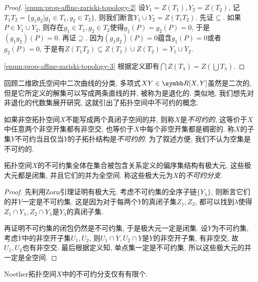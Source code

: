 \begin{proof}
  \ref{enum:prop-affine-zariski-topology-2} 设$Y_1=Z(T_1), Y_2 = Z(T_2)$, 记$T_1T_2=\{g_1g_2\vert g_1\in T_1, g_2\in T_2\}$, 则我们断言$Y_1\cup Y_2 = Z(T_1T_2)$. 先证$\subseteq$. 如果$P\in Y_1\cup Y_2$, 则存在$g_1\in T_1, g_2\in T_2$使得$g_1(P)=g_2(P)=0$, 于是$(g_1g_2)(P)=0$. 再证$\supseteq$. 因为$(g_1g_2)(P)=0$蕴含$g_1(P)=0$或者$g_2(P)=0$, 于是有$Z(T_1T_2)\subseteq Z(T_1)\cup Z(T_2)=Y_1\cup Y_2$.

  \ref{enum:prop-affine-zariski-topology-3} 根据定义即有$\bigcap Z(T_\lambda)=Z(\bigcup T_\lambda)$.
\end{proof}

回顾二维欧氏空间中二次曲线的分类, 多项式$XY\in \RR[X, Y]$虽然是二次的, 但是它所定义的解集可以写成两条直线的并, 被称为是退化的. 类似地, 我们想先对非退化的代数集展开研究, 这就引出了拓扑空间中不可约的概念.

如果非空拓扑空间$X$不能写成两个真闭子空间的并, 则称$X$是\emph{不可约的}, 这等价于$X$中任意两个非空开集都有非空交, 也等价于$X$中每个非空开集都是稠密的. 称$X$的子集$Y$不可约当且仅当$Y$的子拓扑结构是\emph{不可约的}. 为了叙述方便, 我们不认为空集是不可约的.

\begin{proposition}
  拓扑空间$X$的不可约集全体在集合被包含关系定义的偏序集结构有极大元, 这些极大元都是闭集, 并且它们的并为全空间. 称这些极大元为$X$的\emph{不可约分支}.
\end{proposition}

\begin{proof}
  先利用Zorn引理证明有极大元. 考虑不可约集的全序子链$\{Y_\lambda\}$, 则断言它们的并$Y$一定是不可约集. 这是因为对于每两个$Y$的真闭子集$Z_1, Z_2$, 都可以找到$\lambda$使得$Z_1\cap Y_\lambda, Z_2\cap Y_\lambda$是$Y_\lambda$的真闭子集.

  再证明不可约集的闭包仍然是不可约集, 于是极大元一定是闭集. 设$Y$为不可约集, 考虑$\overline{Y}$中的非空开子集$U_1, U_2$, 则$U_1\cap Y, U_2\cap Y$是$Y$的非空开子集, 有非空交, 故$U_1, U_2$也有非空交. 最后根据定义知, 单点集一定是不可约集, 所以这些极大元的并一定是全空间.
\end{proof}

\begin{proposition}\label{prop:noetherirreduciblecomponent}
  Noether拓扑空间$X$中的不可约分支仅有有限个.
\end{proposition}


